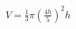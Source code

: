 \documentclass[preview]{standalone}
\begin{document}
\begin{align*}
V = \frac{1}{3} \pi \left(\frac{4h}{5}\right)^2 h
\end{align*}
\end{document}
